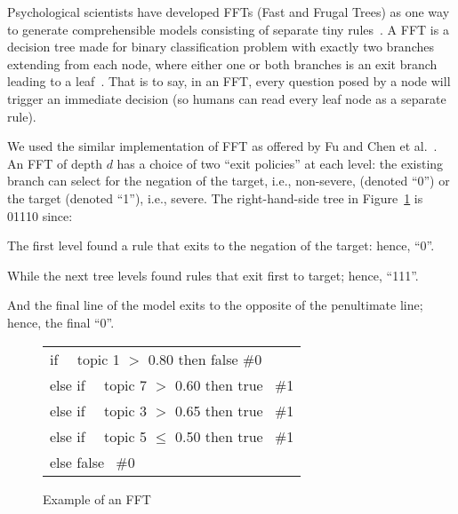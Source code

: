 Psychological scientists have developed FFTs (Fast and Frugal Trees) as one way
  to generate comprehensible models consisting of
   separate tiny rules~\cite{phillips2017fftrees,chen2018applications,martignon2008categorization}.
      A FFT is a decision tree made for binary classification problem with exactly two branches extending
        from each node, where either one or both branches is an exit
        branch leading to a leaf~\cite{martignon2008categorization}. 
        That is to say, in an FFT,  every question posed by a node will
        trigger an immediate decision
        (so humans can read every leaf node
        as a separate rule).



We used the similar implementation of FFT as offered by Fu and Chen et al.~\cite{fu2018building,chen2018applications}. 
An FFT of depth $d$ has a choice of two ``exit policies'' at each level: the existing branch can select for the negation of the target, i.e., non-severe, (denoted ``0'') or the target (denoted ``1''), i.e., severe.
The right-hand-side tree in Figure~\ref{fig:fft1} is 01110 since:
\bi
\item
The first level found a rule that exits to the negation of the target: hence, ``0''.
\item
While the next tree levels found rules that
exit first to target; hence, ``111''.
\item
And the final line of the model exits
to the opposite of the penultimate line; hence, the final ``0''.
\ei

\begin{figure}[!b]

 {\normalsize
\begin{minipage}{\linewidth}
\begin{tabular}{p{\linewidth}}
  \qquad  if  \qquad \ \ topic 1 $>$  0.80   \qquad \qquad  then false \qquad \#0 \\
  \qquad  else if \ \ topic 7 $>$  0.60    \qquad \qquad   then true \qquad \  \#1 \\
   \qquad else if \ \ topic 3 $>$  0.65   \qquad \qquad  then true \qquad \  \#1 \\
   \qquad else if \ \ topic 5 $\leq$ 0.50    \qquad \qquad  then true \qquad \  \#1 \\
   \qquad else \qquad \qquad \qquad \qquad \qquad \qquad false \qquad \qquad \ \#0 
\end{tabular}
\end{minipage}
}
\vspace{-0.25cm}
\caption{Example of an FFT}
\label{fig:fft1}
\end{figure}

